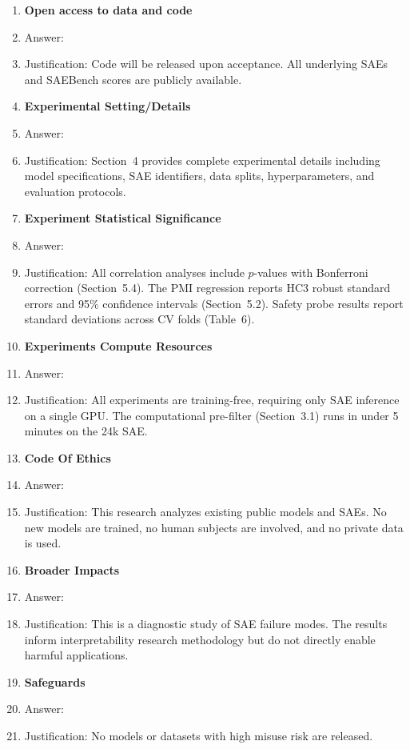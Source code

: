 \documentclass{article}
\begin{document}
\begin{enumerate}
\item {\bf Open access to data and code}
    \item[] Answer: \answerNo{}
    \item[] Justification: Code will be released upon acceptance. All underlying SAEs and SAEBench scores are publicly available.

\item {\bf Experimental Setting/Details}
    \item[] Answer: \answerYes{}
    \item[] Justification: Section~4 provides complete experimental details including model specifications, SAE identifiers, data splits, hyperparameters, and evaluation protocols.

\item {\bf Experiment Statistical Significance}
    \item[] Answer: \answerYes{}
    \item[] Justification: All correlation analyses include $p$-values with Bonferroni correction (Section~5.4). The PMI regression reports HC3 robust standard errors and 95\% confidence intervals (Section~5.2). Safety probe results report standard deviations across CV folds (Table~6).

\item {\bf Experiments Compute Resources}
    \item[] Answer: \answerYes{}
    \item[] Justification: All experiments are training-free, requiring only SAE inference on a single GPU. The computational pre-filter (Section~3.1) runs in under 5 minutes on the 24k SAE.

\item {\bf Code Of Ethics}
    \item[] Answer: \answerYes{}
    \item[] Justification: This research analyzes existing public models and SAEs. No new models are trained, no human subjects are involved, and no private data is used.

\item {\bf Broader Impacts}
    \item[] Answer: \answerNA{}
    \item[] Justification: This is a diagnostic study of SAE failure modes. The results inform interpretability research methodology but do not directly enable harmful applications.

\item {\bf Safeguards}
    \item[] Answer: \answerNA{}
    \item[] Justification: No models or datasets with high misuse risk are released.


\end{enumerate}
\end{document}
